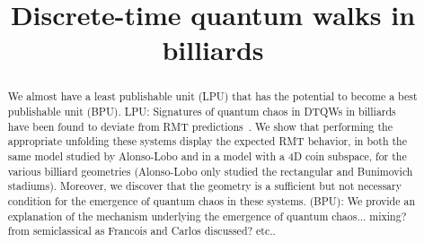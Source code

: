 \title{Discrete-time quantum walks in billiards}
\date{}
\begin{abstract} %
We almost have a least publishable unit (LPU) that has the potential to become a best publishable unit (BPU).
LPU: Signatures of quantum chaos in DTQWs in billiards have been found to deviate from RMT predictions~\cite{alonso-lobo_2025_Simplest}. We show that performing the appropriate unfolding these systems display the expected RMT behavior, in both the same model studied by Alonso-Lobo and in a model with a 4D coin subspace, for the various billiard geometries (Alonso-Lobo only studied the rectangular and Bunimovich stadiums). Moreover, we discover that the geometry is a sufficient but not necessary condition for the emergence of quantum chaos in these systems. (BPU): We provide an explanation of the mechanism underlying the emergence of quantum chaos... mixing? from semiclassical as Francois and Carlos discussed? etc..
\end{abstract} %
\maketitle

